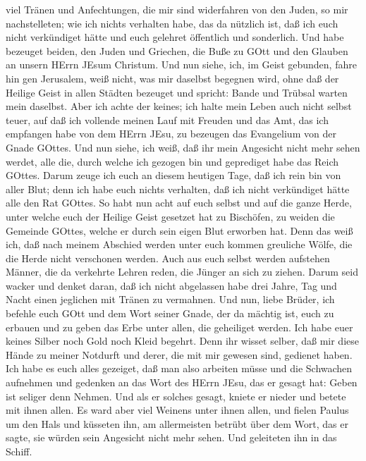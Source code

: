 viel Tränen und Anfechtungen, die mir sind widerfahren von den Juden, so
mir nachstelleten;  wie ich nichts verhalten habe, das da
nützlich ist, daß ich euch nicht verkündiget hätte und euch gelehret
öffentlich und sonderlich.  Und habe bezeuget beiden, den
Juden und Griechen, die Buße zu GOtt und den Glauben an unsern HErrn
JEsum Christum.  Und nun siehe, ich, im Geist gebunden,
fahre hin gen Jerusalem, weiß nicht, was mir daselbst begegnen wird,
 ohne daß der Heilige Geist in allen Städten bezeuget und
spricht: Bande und Trübsal warten mein daselbst.  Aber ich
achte der keines; ich halte mein Leben auch nicht selbst teuer, auf daß
ich vollende meinen Lauf mit Freuden und das Amt, das ich empfangen habe
von dem HErrn JEsu, zu bezeugen das Evangelium von der Gnade GOttes.
 Und nun siehe, ich weiß, daß ihr mein Angesicht nicht mehr
sehen werdet, alle die, durch welche ich gezogen bin und geprediget habe
das Reich GOttes.  Darum zeuge ich euch an diesem heutigen
Tage, daß ich rein bin von aller Blut;  denn ich habe euch
nichts verhalten, daß ich nicht verkündiget hätte alle den Rat GOttes.
 So habt nun acht auf euch selbst und auf die ganze Herde,
unter welche euch der Heilige Geist gesetzet hat zu Bischöfen, zu weiden
die Gemeinde GOttes, welche er durch sein eigen Blut erworben hat.
 Denn das weiß ich, daß nach meinem Abschied werden unter
euch kommen greuliche Wölfe, die die Herde nicht verschonen werden.
 Auch aus euch selbst werden aufstehen Männer, die da
verkehrte Lehren reden, die Jünger an sich zu ziehen. 
Darum seid wacker und denket daran, daß ich nicht abgelassen habe drei
Jahre, Tag und Nacht einen jeglichen mit Tränen zu vermahnen.
 Und nun, liebe Brüder, ich befehle euch GOtt und dem Wort
seiner Gnade, der da mächtig ist, euch zu erbauen und zu geben das Erbe
unter allen, die geheiliget werden.  Ich habe euer keines
Silber noch Gold noch Kleid begehrt.  Denn ihr wisset
selber, daß mir diese Hände zu meiner Notdurft und derer, die mit mir
gewesen sind, gedienet haben.  Ich habe es euch alles
gezeiget, daß man also arbeiten müsse und die Schwachen aufnehmen und
gedenken an das Wort des HErrn JEsu, das er gesagt hat: Geben ist
seliger denn Nehmen.  Und als er solches gesagt, kniete er
nieder und betete mit ihnen allen.  Es ward aber viel
Weinens unter ihnen allen, und fielen Paulus um den Hals und küsseten
ihn,  am allermeisten betrübt über dem Wort, das er sagte,
sie würden sein Angesicht nicht mehr sehen. Und geleiteten ihn in das
Schiff.

